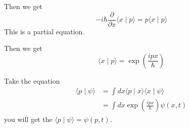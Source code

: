Then we get
\begin{equation}
	-i\hbar\frac{\partial}{\partial x}\langle x\mid p\rangle=p\langle x\mid p\rangle
\end{equation}
This is a partial equation.

Then we get
\begin{equation}
	\langle x\mid p\rangle=\exp\left(\frac{i p x}{\hbar}\right)
\end{equation}

Take the equation
\begin{align}
	\langle p\mid\psi\rangle&=\int d x\langle p\mid x\rangle\langle x\mid\psi\rangle\\
	&=\int d x\exp\left(\frac{i p x}{\hbar}\right)\psi(x, t)
\end{align}
you will get the $\langle p\mid\psi\rangle=\psi(p, t)$.



\newpage